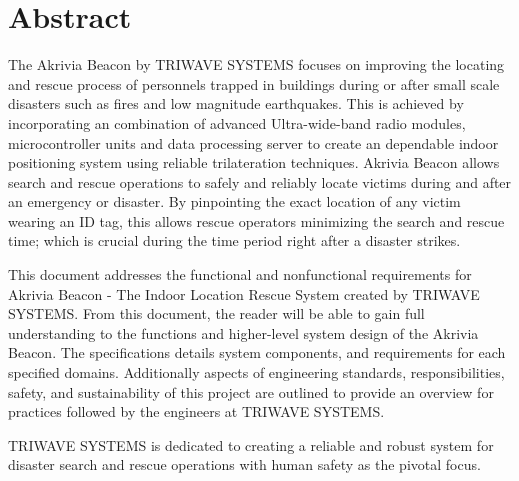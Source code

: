 %


\section*{Abstract}	
\medskip
The Akrivia Beacon by TRIWAVE SYSTEMS focuses on improving the locating and rescue process of personnels trapped in buildings during or after small scale disasters such as fires and low magnitude earthquakes. This is achieved by incorporating an combination of advanced Ultra-wide-band radio modules, microcontroller units and data processing server to create an dependable indoor positioning system using reliable trilateration techniques. Akrivia Beacon allows search and rescue operations to safely and reliably locate victims during and after an emergency or disaster. By pinpointing the exact location of any victim wearing an ID tag, this allows rescue operators minimizing the search and rescue time; which is crucial during the time period right after a disaster strikes.

\bigskip
This document addresses the functional and nonfunctional requirements for Akrivia Beacon - The Indoor Location Rescue System created by TRIWAVE SYSTEMS. From this document, the reader will be able to gain full understanding to the functions and higher-level system design of the Akrivia Beacon. The specifications details system components, and requirements for each specified domains. Additionally aspects of engineering standards, responsibilities, safety, and sustainability of this project are outlined to provide an overview for practices followed by the engineers at TRIWAVE SYSTEMS.

\bigskip
TRIWAVE SYSTEMS is dedicated to creating a reliable and robust system for disaster search and rescue operations with human safety as the pivotal focus.  

%